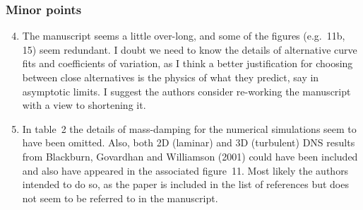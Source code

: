 \documentclass[a4paper,11pt]{article}
\begin{document}
\subsubsection*{Minor points}

\begin{enumerate}

\setcounter{enumi}{3}

\item
The manuscript seems a little over-long, and some of the figures
(e.g.\ 11b, 15) seem redundant. I doubt we need to know the details of
alternative curve fits and coefficients of variation, as I think a
better justification for choosing between close alternatives is the
physics of what they predict, say in asymptotic limits. I suggest the
authors consider re-working the manuscript with a view to shortening
it.

\item
In table~2 the details of mass-damping for the numerical simulations
seem to have been omitted. Also, both 2D (laminar) and 3D (turbulent)
DNS results from Blackburn, Govardhan and Williamson (2001) could have
been included and also have appeared in the associated figure~11. Most
likely the authors intended to do so, as the paper is included in the
list of references but does not seem to be referred to in the
manuscript.

\end{enumerate}
\end{document}
